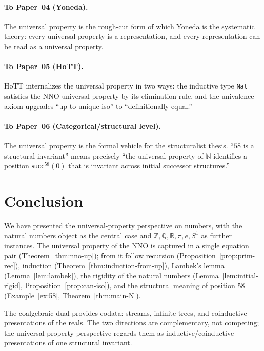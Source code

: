 \documentclass[12pt]{article}
\theoremstyle{definition}
\theoremstyle{remark}
\newcommand{\N}{\mathbb{N}}
\newcommand{\Z}{\mathbb{Z}}
\newcommand{\Q}{\mathbb{Q}}
\newcommand{\R}{\mathbb{R}}
\newcommand{\suc}{\mathsf{succ}}
\begin{document}
\paragraph{To Paper~04 (Yoneda).} The universal property is the rough-cut form of which Yoneda is the systematic theory: every universal property is a representation, and every representation can be read as a universal property.

\paragraph{To Paper~05 (HoTT).} HoTT internalizes the universal property in two ways: the inductive type \texttt{Nat} satisfies the NNO universal property by its elimination rule, and the univalence axiom upgrades ``up to unique iso'' to ``definitionally equal.''

\paragraph{To Paper~06 (Categorical/structural level).} The universal property is the formal vehicle for the structuralist thesis. ``$58$ is a structural invariant'' means precisely ``the universal property of $\N$ identifies a position $\suc^{58}(0)$ that is invariant across initial successor structures.''

\section{Conclusion}
\label{sec:conclusion}

We have presented the universal-property perspective on numbers, with the natural numbers object as the central case and $\Z, \Q, \R, \pi, e, S^1$ as further instances. The universal property of the NNO is captured in a single equation pair (Theorem~\ref{thm:nno-up}); from it follow recursion (Proposition~\ref{prop:prim-rec}), induction (Theorem~\ref{thm:induction-from-up}), Lambek's lemma (Lemma~\ref{lem:lambek}), the rigidity of the natural numbers (Lemma~\ref{lem:initial-rigid}, Proposition~\ref{prop:can-iso}), and the structural meaning of position 58 (Example~\ref{ex:58}, Theorem~\ref{thm:main-N}).

The coalgebraic dual provides codata: streams, infinite trees, and coinductive presentations of the reals. The two directions are complementary, not competing; the universal-property perspective regards them as inductive/coinductive presentations of one structural invariant.
\end{document}
